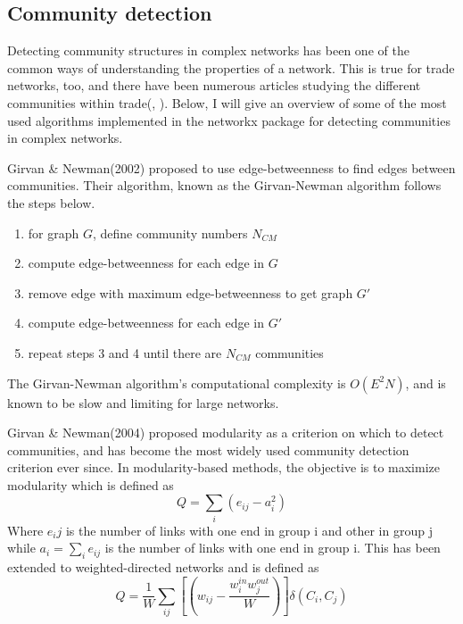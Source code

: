 \documentclass[a4paper, 12pt]{article}
\begin{document}
\subsection{Community detection}
Detecting community structures in complex networks has been one of the common ways of understanding the properties of a network. 
This is true for trade networks, too, and there have been numerous articles studying the different communities within trade(\cite{torreggiani2018identifying}, \cite{barigozzi2011}).
Below, I will give an overview of some of the most used algorithms implemented in the networkx\cite{hagberg2008exploring} package for detecting communities in complex networks.\par
Girvan \& Newman(2002) \cite{girvan2002} proposed to use edge-betweenness to find edges between communities.
Their algorithm, known as the Girvan-Newman algorithm follows the steps below.
\begin{enumerate}
    \item for graph $G$, define community numbers $N_{CM}$
    \item compute edge-betweenness for each edge in $G$
    \item remove edge with maximum edge-betweenness to get graph $G'$
    \item compute edge-betweenness for each edge in $G'$
    \item repeat steps 3 and 4 until there are $N_{CM}$ communities
\end{enumerate}
The Girvan-Newman algorithm's computational complexity is $O(E^2N)$, and is known to be slow and limiting for large networks\cite{yang2016comparative}.\par
Girvan \& Newman(2004)\cite{newman2004finding} proposed modularity as a criterion on which to detect communities, and has become the most widely used community detection criterion ever since.
In modularity-based methods, the objective is to maximize modularity which is defined as
\begin{equation}
    Q = \sum_i{(e_{ij} - a_i^2)}
\end{equation}
Where $e_ij$ is the number of links with one end in group i and other in group j while $a_i = \sum_i{e_{ij}}$ is the number of links with one end in group i.
This has been extended to weighted-directed networks\cite{arenas2007} and is defined as
\begin{equation}
    Q = \frac{1}{W}\sum_{ij}{\left[(w_{ij} - \frac{w_i^{in}w_j^{out}}{W})\right]}\delta(C_i, C_j)
\end{equation}
\end{document}
